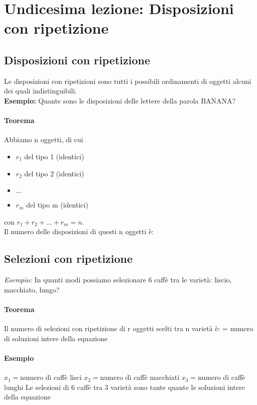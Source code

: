 \section{Undicesima lezione: Disposizioni con ripetizione}

\subsection{Disposizioni con ripetizione} 
Le disposizioni con ripetizioni sono tutti i possibili ordinamenti di oggetti alcuni dei quali indistinguibili. \\
\textbf{Esempio:} Quante sono le disposizioni delle lettere della parola BANANA?

\paragraph{Teorema} 
Abbiamo n oggetti, di cui
\begin{itemize}
    \item $r_1$ del tipo 1 (identici)
    \item $r_2$ del tipo 2 (identici)
    \item $\dots$
    \item $r_m$ del tipo m (identici)
\end{itemize}
con $r_1 + r_2 + ... + r_m = n$. \\
Il numero delle disposizioni di questi n oggetti è:


\subsection{Selezioni con ripetizione}
\textit{Esempio:} In quanti modi possiamo selezionare 6 caffè tra le varietà:
liscio, macchiato, lungo?

\paragraph{Teorema}
Il numero di selezioni con ripetizione di r oggetti scelti tra n varietà è:
= numero di soluzioni intere della equazione

\paragraph{Esempio} %
$x_1 = $numero di caffè lisci
$x_2 = $numero di caffè macchiati
$x_3 = $numero di caffè lunghi
Le selezioni di 6 caffè tra 3 varietà sono tante quante le soluzioni intere della equazione


